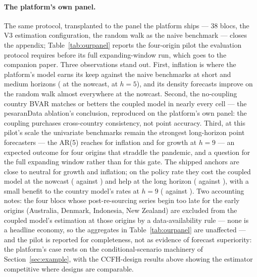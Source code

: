 \paragraph{The platform's own panel.} The same protocol, transplanted to the panel the
platform ships --- 38 blocs, the V3 estimation configuration, the random walk as the
naive benchmark --- closes the appendix; Table~\ref{tab:ourpanel} reports the four-origin
pilot the evaluation protocol requires before its full expanding-window run, which goes
to the companion paper. Three observations stand out. First, inflation is where the
platform's model earns its keep against the naive benchmarks at short and medium
horizons (\OpGbvarIHOne{} at the nowcast, \OpGbvarIHFive{} at $h=5$), and its density
forecasts improve on the random walk almost everywhere at the nowcast. Second, the
no-coupling country BVAR matches or betters the coupled model in nearly every cell ---
the pesaranData ablation's conclusion, reproduced on the platform's own panel: the
coupling purchases cross-country consistency, not point accuracy. Third, at this pilot's
scale the univariate benchmarks remain the strongest long-horizon point forecasters ---
the AR(5) reaches \OpArFiveIHNine{} for inflation and \OpArFiveGHNine{} for growth at
$h=9$ --- an expected outcome for four origins that straddle the pandemic, and a
question for the full expanding window rather than for this gate. The
shipped anchors are close to neutral for growth and inflation; on the policy rate they
cost the coupled model at the nowcast (\OpAnchRHOne{} against \OpGbvarRHOne{}) and help
at the long horizon (\OpAnchRHNine{} against \OpGbvarRHNine{}), with a small benefit to
the country model's rates at $h=9$ (\OpSbvarAnchRHNine{} against \OpSbvarRHNine{}). Two
accounting notes: the four blocs whose post-re-sourcing series begin too late for the
early origins (Australia, Denmark, Indonesia, New Zealand) are excluded from the coupled
model's estimation at those origins by a data-availability rule --- none is a headline
economy, so the aggregates in Table~\ref{tab:ourpanel} are unaffected --- and the pilot
is reported for completeness, not as evidence of forecast superiority: the platform's
case rests on the conditional-scenario machinery of Section~\ref{sec:example}, with the
CCFH-design results above showing the estimator competitive where designs are
comparable.

